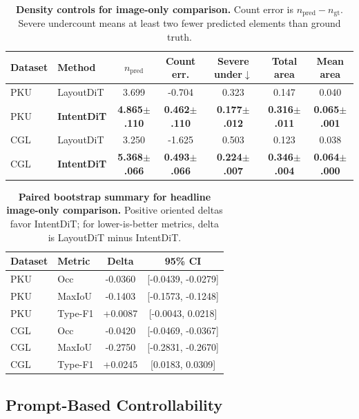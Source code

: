 \documentclass[review]{elsarticle}
\newcommand{\ms}[2]{#1{\scriptsize$\pm$#2}}
\begin{document}
\begin{table}[!t]
\caption{\textbf{Density controls for image-only comparison.}
Count error is $n_{\text{pred}}-n_{\text{gt}}$.
Severe undercount means at least two fewer predicted elements than ground truth.}
\label{tab:density_controls_compact}
\centering
\scriptsize
\setlength{\tabcolsep}{4pt}
\begin{tabular}{llccccc}
\toprule
\textbf{Dataset} & \textbf{Method} & $n_{\text{pred}}$ & Count err. & Severe under$\downarrow$ & Total area & Mean area \\
\midrule
PKU & LayoutDiT & 3.699 & -0.704 & 0.323 & 0.147 & 0.040 \\
PKU & \textbf{IntentDiT} & \textbf{\ms{4.865}{.110}} & \textbf{\ms{0.462}{.110}} & \textbf{\ms{0.177}{.012}} & \textbf{\ms{0.316}{.011}} & \textbf{\ms{0.065}{.001}} \\
\midrule
CGL & LayoutDiT & 3.250 & -1.625 & 0.503 & 0.123 & 0.038 \\
CGL & \textbf{IntentDiT} & \textbf{\ms{5.368}{.066}} & \textbf{\ms{0.493}{.066}} & \textbf{\ms{0.224}{.007}} & \textbf{\ms{0.346}{.004}} & \textbf{\ms{0.064}{.000}} \\
\bottomrule
\end{tabular}
\end{table}

\begin{table}[!t]
\caption{\textbf{Paired bootstrap summary for headline image-only comparison.}
Positive oriented deltas favor IntentDiT; for lower-is-better metrics, delta is LayoutDiT minus IntentDiT.}
\label{tab:bootstrap_compact}
\centering
\scriptsize
\begin{tabular}{llcc}
\toprule
\textbf{Dataset} & \textbf{Metric} & \textbf{Delta} & \textbf{95\% CI} \\
\midrule
PKU & Occ & -0.0360 & [-0.0439, -0.0279] \\
PKU & MaxIoU & -0.1403 & [-0.1573, -0.1248] \\
PKU & Type-F1 & +0.0087 & [-0.0043, 0.0218] \\
\midrule
CGL & Occ & -0.0420 & [-0.0469, -0.0367] \\
CGL & MaxIoU & -0.2750 & [-0.2831, -0.2670] \\
CGL & Type-F1 & +0.0245 & [0.0183, 0.0309] \\
\bottomrule
\end{tabular}
\end{table}

\subsection{Prompt-Based Controllability}
\label{sec:control}
\end{document}
